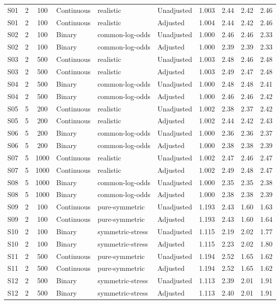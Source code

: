 \documentclass[12pt,a4paper]{article}
\theoremstyle{definition}
\theoremstyle{remark}\newtheorem{remark}{Remark}
\numberwithin{equation}{section}
\begin{document}
\begin{longtable}{@{}ccclllcccc@{}}
S01 & 2 & 100 & Continuous & realistic & Unadjusted & 1.003 & 2.44 & 2.42 & 2.46 \\
S01 & 2 & 100 & Continuous & realistic & Adjusted   & 1.004 & 2.44 & 2.42 & 2.46 \\
S02 & 2 & 100 & Binary & common-log-odds & Unadjusted & 1.000 & 2.46 & 2.46 & 2.33 \\
S02 & 2 & 100 & Binary & common-log-odds & Adjusted   & 1.000 & 2.39 & 2.39 & 2.33 \\
S03 & 2 & 500 & Continuous & realistic & Unadjusted & 1.003 & 2.48 & 2.46 & 2.48 \\
S03 & 2 & 500 & Continuous & realistic & Adjusted   & 1.003 & 2.49 & 2.47 & 2.48 \\
S04 & 2 & 500 & Binary & common-log-odds & Unadjusted & 1.000 & 2.48 & 2.48 & 2.41 \\
S04 & 2 & 500 & Binary & common-log-odds & Adjusted   & 1.000 & 2.46 & 2.46 & 2.42 \\
S05 & 5 & 200 & Continuous & realistic & Unadjusted & 1.002 & 2.38 & 2.37 & 2.42 \\
S05 & 5 & 200 & Continuous & realistic & Adjusted   & 1.002 & 2.44 & 2.42 & 2.43 \\
S06 & 5 & 200 & Binary & common-log-odds & Unadjusted & 1.000 & 2.36 & 2.36 & 2.37 \\
S06 & 5 & 200 & Binary & common-log-odds & Adjusted   & 1.000 & 2.38 & 2.38 & 2.39 \\
S07 & 5 & 1000 & Continuous & realistic & Unadjusted & 1.002 & 2.47 & 2.46 & 2.47 \\
S07 & 5 & 1000 & Continuous & realistic & Adjusted   & 1.002 & 2.49 & 2.48 & 2.47 \\
S08 & 5 & 1000 & Binary & common-log-odds & Unadjusted & 1.000 & 2.35 & 2.35 & 2.38 \\
S08 & 5 & 1000 & Binary & common-log-odds & Adjusted   & 1.000 & 2.38 & 2.38 & 2.39 \\
S09 & 2 & 100 & Continuous & pure-symmetric & Unadjusted & 1.193 & 2.43 & 1.60 & 1.63 \\
S09 & 2 & 100 & Continuous & pure-symmetric & Adjusted   & 1.193 & 2.43 & 1.60 & 1.64 \\
S10 & 2 & 100 & Binary & symmetric-stress & Unadjusted & 1.115 & 2.19 & 2.02 & 1.77 \\
S10 & 2 & 100 & Binary & symmetric-stress & Adjusted   & 1.115 & 2.23 & 2.02 & 1.80 \\
S11 & 2 & 500 & Continuous & pure-symmetric & Unadjusted & 1.194 & 2.52 & 1.65 & 1.62 \\
S11 & 2 & 500 & Continuous & pure-symmetric & Adjusted   & 1.194 & 2.52 & 1.65 & 1.62 \\
S12 & 2 & 500 & Binary & symmetric-stress & Unadjusted & 1.113 & 2.39 & 2.01 & 1.91 \\
S12 & 2 & 500 & Binary & symmetric-stress & Adjusted   & 1.113 & 2.40 & 2.01 & 1.91 \\

\end{longtable}
\end{document}
